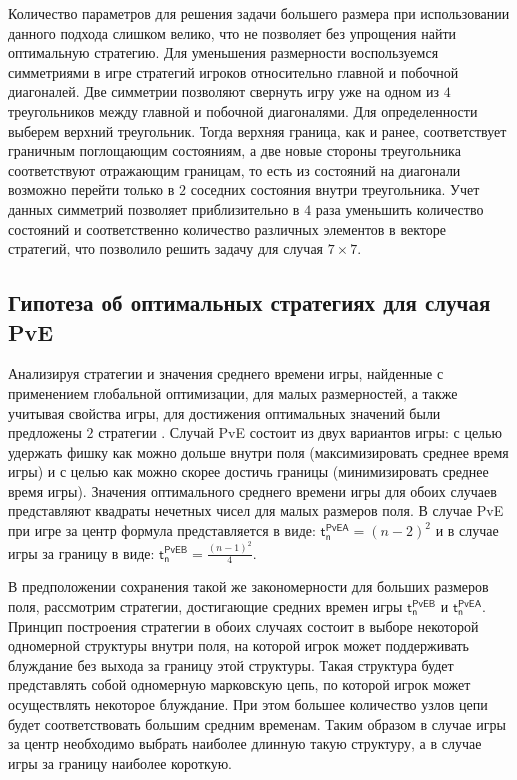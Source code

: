 Количество параметров для решения задачи большего размера при использовании данного подхода слишком велико, что не позволяет без упрощения найти оптимальную стратегию.
Для уменьшения размерности воспользуемся симметриями в игре стратегий игроков относительно главной и побочной диагоналей. 
Две симметрии позволяют свернуть игру уже на одном из $4$ треугольников между главной и побочной диагоналями. 
Для определенности выберем верхний треугольник. Тогда верхняя граница, как и ранее, соответствует граничным поглощающим состояниям,
а две новые стороны треугольника соответствуют отражающим границам, то есть из состояний на диагонали возможно перейти только в $2$ соседних состояния внутри треугольника.
Учет данных симметрий позволяет приблизительно в $4$ раза уменьшить количество состояний и соответственно количество различных элементов в векторе стратегий,
что позволило решить задачу для случая $7 \times 7$. 

\subsection{Гипотеза об оптимальных стратегиях для случая PvE}\label{subsec:ch3/sec1/sub3}

Анализируя стратегии и значения среднего времени игры, найденные с применением глобальной оптимизации, для малых размерностей,
а также учитывая свойства игры, для достижения оптимальных значений были предложены $2$ стратегии \cite{confbib1}.
Случай PvE состоит из двух вариантов игры: с целью удержать фишку как можно дольше внутри поля (максимизировать среднее время игры)
и с целью как можно скорее достичь границы (минимизировать среднее время игры). 
Значения оптимального среднего времени игры для обоих случаев представляют квадраты нечетных чисел для малых размеров поля.
В случае PvE при игре за центр формула представляется в виде: $\boldsymbol{\mathsf{t_n^{PvE A}}} = (n-2)^2$ и в случае
игры за границу в виде: $\boldsymbol{\mathsf{t_n^{PvE B}}} = \frac{(n-1)^2}{4}$. 

В предположении сохранения такой же закономерности для больших размеров поля, рассмотрим стратегии, достигающие
средних времен игры $\boldsymbol{\mathsf{t_n^{PvE B}}}$ и $\boldsymbol{\mathsf{t_n^{PvE A}}}$. Принцип построения стратегии в обоих случаях 
состоит в выборе некоторой одномерной структуры внутри поля, на которой игрок может поддерживать блуждание без выхода за границу этой структуры.
Такая структура будет представлять собой одномерную марковскую цепь, по которой игрок может осуществлять некоторое блуждание.
При этом большее количество узлов цепи будет соответствовать большим средним временам. Таким образом в случае игры за центр
необходимо выбрать наиболее длинную такую структуру, а в случае игры за границу наиболее короткую.

